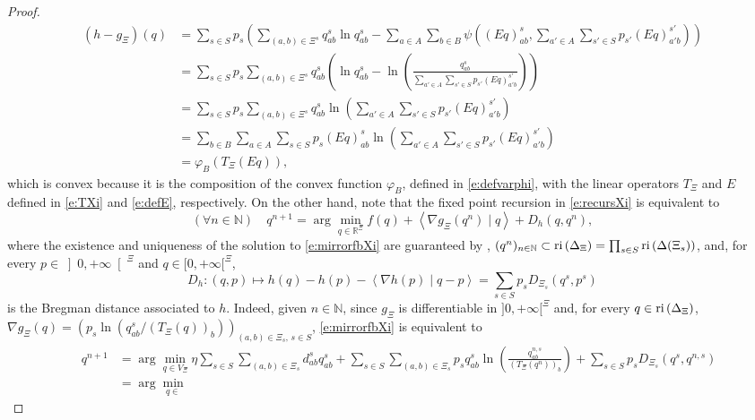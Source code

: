\documentclass[smallextended,referee,envcountsect,]{svjour3}
\newcommand{\reli}{\ensuremath{\text{\rm ri}\,}}
\newcommand{\NN}{{\mathbb N}}
\newcommand{\R}{{\mathbb R}}
\newcommand{\scal}[2]{{\left\langle{{#1}\mid{#2}}\right\rangle}}
\begin{document}
\begin{proof}
\begin{align}
(h-g_{\Xi})(q)&=
\sum_{s\in S}p_s\left(\sum_{(a,b)\in \Xi^s}q_{ab}^s\ln 
q_{ab}^s-\sum_{a\in A}\sum_{b\in 
B}\psi\left((Eq)_{ab}^s,\sum_{a'\in A}\sum_{s'\in 
S}p_{s'}(Eq)_{a'b}^{s'}\right)
\right)\nonumber\\
&=
\sum_{s\in S}p_s\sum_{(a,b)\in \Xi^s}q_{ab}^s\left(\ln 
q_{ab}^s-\ln\left(\frac{q_{ab}^s}{{\sum\limits_{a'\in 
A}\sum\limits_{s'\in 
S}}p_{s'}(Eq)_{a'b}^{s'}}\right)\right)\nonumber\\
&=
\sum_{s\in S}p_s\sum_{(a,b)\in \Xi^s}q_{ab}^s\ln\left({\sum_{a'\in 
A}\sum_{s'\in 
S}p_{s'}(Eq)_{a'b}^{s'}}\right)\nonumber\\
&=
\sum_{b\in 
B}\sum_{a\in A}\sum_{s\in S}p_s(Eq)_{ab}^s\ln\left({\sum_{a'\in 
A}\sum_{s'\in 
S}p_{s'}(Eq)_{a'b}^{s'}}\right)\nonumber\\
&=\varphi_B(T_{\Xi}(Eq)),
\end{align}
which is convex because it is the composition of the convex 
function $\varphi_B$, defined in \eqref{e:defvarphi},
with the linear operators
$T{_{\Xi}}$ and $E$
defined in \eqref{e:TXi} and \eqref{e:defE}, respectively.
On the other hand, note that the fixed point recursion in 
\eqref{e:recursXi} is equivalent to 
\begin{equation}
\label{e:mirrorfbXi}
(\forall n\in\NN)\quad q^{n+1}=\arg\min_{q\in 
\R^\Xi}f(q)+{\scal{\nabla
 g_{\Xi}(q^n)}{q}}+D_h(q,q^n),
\end{equation}
where the existence and uniqueness of the 
solution to \eqref{e:mirrorfbXi} are guaranteed by 
\cite[Lemma~2]{BauMOR},  $(q^n)_{n\in\NN}\subset 
\reli(\Delta_\Xi)=\prod_{s\in 
S}\reli(\Delta(\Xi_s))$, and,
for every $p\in\left]0,+\infty\right[^\Xi$ and $q\in[0,+\infty[^\Xi$,
\begin{equation}
\label{e:breghXi}
D_h\colon (q,p)\mapsto h(q)-h(p)-\scal{\nabla 
h(p)}{q-p}=\sum_{s\in S}p_s {D_{\Xi_s}(q^s,p^s)}
\end{equation} 
is the Bregman distance associated to $h$. 
Indeed, given $n\in\NN$, since $g_{\Xi}$ is 
differentiable in 
$]0,+\infty[^{\Xi}$ and, for every $q\in \reli(\Delta_\Xi)$, 
$\nabla 
g_{\Xi}(q)= 
(p_s\ln(q_{ab}^s/(T_{\Xi}(q))_b))_{(a,b)\in\Xi_s,\,s\in S}$, 
\eqref{e:mirrorfbXi} is 
equivalent 
to
{\begin{align}
\quad q^{n+1}&=\arg\min_{q\in V_{\Xi}}
\eta\sum_{s\in S}\sum_{(a,b)\in\Xi_s}d_{ab}^sq_{ab}^s+
\sum_{s\in S}\sum_{(a,b)\in\Xi_s}p_sq_{ab}^s
\ln\left(\frac{q_{ab}^{n,s}}{(T_{\Xi}(q^n))_b}\right)
+\sum_{s\in S}
p_sD_{\Xi_s}(q^s,q^{n,s})\nonumber\\
&=\arg\min_{q\in 
}
\end{align}}
\end{proof}
\end{document}
